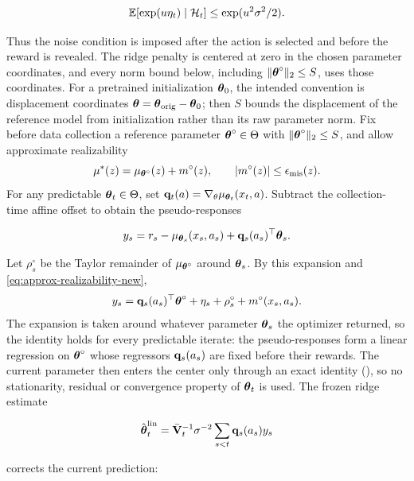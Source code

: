 \begin{equation}\label{eq:new-noise-condition}
 \mathbb E[\exp(u\eta_t)\mid\mathcal{H}_t]
 \le\exp(u^2\sigma^2/2).
\end{equation}

Thus the noise condition is imposed after the action is selected and before
the reward is revealed.  The ridge penalty is centered at zero in the chosen
parameter coordinates, and every norm bound below, including
$\|\boldsymbol{\theta}^\circ\|_2\le S$, uses those coordinates.  For a pretrained
initialization $\boldsymbol{\theta}_0$, the intended convention is displacement coordinates
$\boldsymbol{\theta}=\boldsymbol{\theta}_{\rm orig}-\boldsymbol{\theta}_0$; then $S$ bounds the displacement of the
reference model from initialization rather than its raw parameter norm.  Fix
before data collection a reference parameter $\boldsymbol{\theta}^\circ\in\Theta$ with
$\|\boldsymbol{\theta}^\circ\|_2\le S$, and allow
approximate realizability
\begin{equation}\label{eq:approx-realizability-new}
 \mu^*(z)=\mu_{\boldsymbol{\theta}^\circ}(z)+m^\circ(z),\qquad
 |m^\circ(z)|\le\epsilon_{\rm mis}(z).
\end{equation}
For any predictable $\boldsymbol{\theta}_t\in\Theta$, set
$\mathbf{q}_t(a)=\nabla_\theta\mu_{\boldsymbol{\theta}_t}(x_t,a)$. Subtract the collection-time
affine offset to obtain the pseudo-responses

\begin{equation}\label{eq:pseudo-response-new}
 y_s=r_s-\mu_{\boldsymbol{\theta}_s}(x_s,a_s)+\mathbf{q}_s(a_s)^\top\boldsymbol{\theta}_s.
\end{equation}

Let $\rho_s^\circ$ be the Taylor remainder of $\mu_{\boldsymbol{\theta}^\circ}$ around
$\boldsymbol{\theta}_s$. By this expansion and \eqref{eq:approx-realizability-new},
\[
 y_s=\mathbf{q}_s(a_s)^\top\boldsymbol{\theta}^\circ+\eta_s+\rho_s^\circ+m^\circ(x_s,a_s).
\]
The expansion is taken around whatever parameter $\boldsymbol{\theta}_s$ the optimizer
returned, so the identity holds for every predictable iterate: the
pseudo-responses form a linear regression on $\boldsymbol{\theta}^\circ$ whose regressors
$\mathbf{q}_s(a_s)$ are fixed before their rewards. The current parameter then
enters the center only through an exact identity
(), so no stationarity, residual or convergence
property of $\boldsymbol{\theta}_t$ is used. The frozen ridge estimate

\begin{equation}\label{eq:frozen-ridge-new}
 \hat{\boldsymbol{\theta}}_t^{\rm lin}=\bar{\mathbf{V}}_t^{-1}\sigma^{-2}\sum_{s<t}\mathbf{q}_s(a_s)y_s
\end{equation}

corrects the current prediction:

